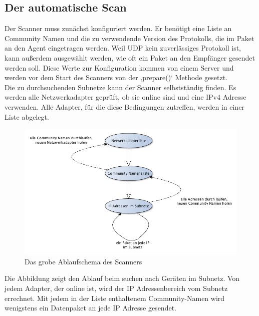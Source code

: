 \documentclass[11pt,a4paper]{article}
\begin{document}
\subsection{Der automatische Scan}
Der Scanner muss zunächst konfiguriert werden. Er benötigt eine Liste an Community Namen und die zu verwendende Version des Protokolls, die im Paket an den Agent eingetragen werden. Weil UDP kein zuverlässiges Protokoll ist, kann außerdem ausgewählt werden, wie oft ein Paket an den Empfänger gesendet werden soll. Diese Werte zur Konfiguration kommen von einem Server und werden vor dem Start des Scanners von der ‚prepare()‘ Methode gesetzt.\\
Die zu durchsuchenden Subnetze kann der Scanner selbstständig finden. Es werden alle Netzwerkadapter geprüft, ob sie online sind und eine IPv4 Adresse verwenden. Alle Adapter, für die diese Bedingungen zutreffen, werden in einer Liste abgelegt.\\
\begin{figure}[h]
	\centering
	\includegraphics[scale=.6]{Bilder/SchemaScanner.png}
	\caption{Das grobe Ablaufschema des Scanners}
\end{figure}
Die Abbildung zeigt den Ablauf beim suchen nach Geräten im Subnetz. Von jedem Adapter, der online ist, wird der IP Adressenbereich vom Subnetz errechnet. Mit jedem in der Liste enthaltenem Community-Namen wird wenigstens ein Datenpaket an jede IP Adresse gesendet.\\
\end{document}
